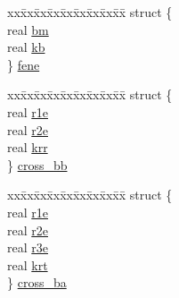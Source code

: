 \begin{DoxyCompactItemize}
\begin{tabbing}
\end{tabbing}\item 
\begin{tabbing}
xx\=xx\=xx\=xx\=xx\=xx\=xx\=xx\=xx\=\kill
struct \{\\
\>real \hyperlink{uniont__iparams_aedae1554764a6b432e2a73dcb678f30d}{bm}\\
\>real \hyperlink{uniont__iparams_a6c8fbc5362283145021c254452016202}{kb}\\
\} \hyperlink{uniont__iparams_a75a980bc01cf48929b0d04d3d40c6fee}{fene}\\

\end{tabbing}\item 
\begin{tabbing}
xx\=xx\=xx\=xx\=xx\=xx\=xx\=xx\=xx\=\kill
struct \{\\
\>real \hyperlink{uniont__iparams_ae02b26d0e0ab550fe4cfce03394745f1}{r1e}\\
\>real \hyperlink{uniont__iparams_a70a44f4e45a7d84efd330354ba816780}{r2e}\\
\>real \hyperlink{uniont__iparams_aca0199cb2cae110d3100d77d4dbbb575}{krr}\\
\} \hyperlink{uniont__iparams_a0636023eed00407022badd11f598581b}{cross\_bb}\\

\end{tabbing}\item 
\begin{tabbing}
xx\=xx\=xx\=xx\=xx\=xx\=xx\=xx\=xx\=\kill
struct \{\\
\>real \hyperlink{uniont__iparams_ae02b26d0e0ab550fe4cfce03394745f1}{r1e}\\
\>real \hyperlink{uniont__iparams_a70a44f4e45a7d84efd330354ba816780}{r2e}\\
\>real \hyperlink{uniont__iparams_ad7f21f15de2058adad587fa20a745762}{r3e}\\
\>real \hyperlink{uniont__iparams_ada7f931977aa8013c7f5220c9c57074d}{krt}\\
\} \hyperlink{uniont__iparams_a0277caef992bddc6cdb84bed3f239de5}{cross\_ba}\\


\end{tabbing}
\end{DoxyCompactItemize}

